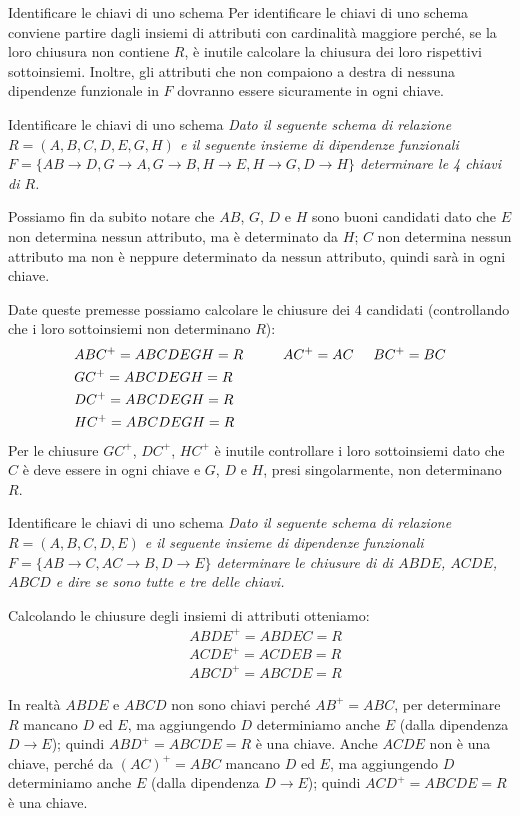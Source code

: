 \begin{Osservation}{Identificare le chiavi di uno schema}{}
    Per identificare le chiavi di uno schema conviene partire dagli insiemi di attributi con cardinalità maggiore perché, se la loro chiusura non contiene $R$, è inutile calcolare la chiusura dei loro rispettivi sottoinsiemi. Inoltre, gli attributi che non compaiono a destra di nessuna dipendenze funzionale in $F$ dovranno essere sicuramente in ogni chiave.
\end{Osservation}

\begin{Example}{Identificare le chiavi di uno schema}{}
    \textit{Dato il seguente schema di relazione $R = (A, B, C, D, E, G, H)$ e il seguente insieme di dipendenze funzionali $F = \{ AB\to D, G\to A, G \to B, H \to E, H \to G, D \to H\}$ determinare le 4 chiavi di $R$.}

    Possiamo fin da subito notare che $AB$, $G$, $D$ e $H$ sono buoni candidati dato che $E$ non determina nessun attributo, ma è determinato da $H$; $C$ non determina nessun attributo ma non è neppure determinato da nessun attributo, quindi sarà in ogni chiave.

    Date queste premesse possiamo calcolare le chiusure dei 4 candidati (controllando che i loro sottoinsiemi non determinano $R$):
    \begin{align*}
        &ABC^+=ABCDEGH=R\hspace{1cm}AC^+=AC\hspace{0.5cm}BC^+=BC\\
        &GC^+=ABCDEGH=R\\
        &DC^+=ABCDEGH=R\\
        &HC^+=ABCDEGH=R
    \end{align*}
    Per le chiusure $GC^+$, $DC^+$, $HC^+$ è inutile controllare i loro sottoinsiemi dato che $C$ è deve essere in ogni chiave e $G$, $D$ e $H$, presi singolarmente, non determinano $R$.
\end{Example}

\begin{Example}{Identificare le chiavi di uno schema}{}
    \textit{Dato il seguente schema di relazione $R = (A, B, C, D, E)$ e il seguente insieme di dipendenze funzionali $F = \{ AB \to C, AC \to B, D \to E \}$ determinare le chiusure di di $ABDE$, $ACDE$, $ABCD$ e dire se sono tutte e tre delle chiavi.}

    Calcolando le chiusure degli insiemi di attributi otteniamo:
    \begin{align*}
        &ABDE^+ =ABDEC =R\\
        &ACDE^+ =ACDEB =R\\
        &ABCD^+ =ABCDE =R
    \end{align*}

    In realtà $ABDE$ e $ABCD$ non sono chiavi perché $AB^+ =ABC$, per determinare $R$ mancano $D$ ed $E$, ma aggiungendo $D$ determiniamo anche $E$ (dalla dipendenza $D\to E$); quindi $ABD^+ =ABCDE =R$ è una chiave.
    Anche $ACDE$ non è una chiave, perché da $(AC)^+ =ABC$ mancano $D$ ed $E$, ma aggiungendo $D$ determiniamo anche $E$ (dalla dipendenza $D\to E$); quindi $ACD^+ =ABCDE =R$ è una chiave.
\end{Example}

